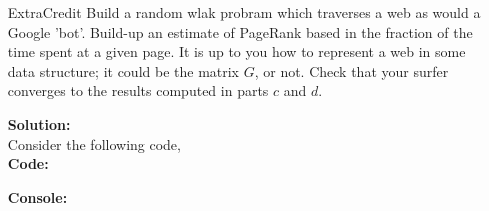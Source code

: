\documentclass[12pt]{article}
\makeatletter
\theoremstyle{homework}
\newenvironment{exercise}[1]
{\def\@currentlabel{#1}\exercisecore}
{\endexercisecore}
\newcommand{\localhead}[1]{\par\smallskip\noindent\textbf{#1}\nobreak\\}%
\newcommand\solution{\localhead{Solution:}}
\makeatother
\begin{document}
\begin{exercise}{P22}
\begin{enumerate}
\item[ExtraCredit] Build a random wlak probram which traverses a web as would a Google 'bot'.
Build-up an estimate of PageRank based in the fraction of the time spent at a given page. It is up to 
you how to represent a web in some data structure; it could be the matrix $G$, or not. Check that your surfer converges to the results computed in 
parts $c$ and $d$.\\
\solution Consider the following code, \\
\textbf{Code:}
\begin{center}
  
\end{center} 
\textbf{Console:}
\begin{center}
  
\end{center} 












\end{enumerate}
\end{exercise}





\vspace{1in}
\end{document}
